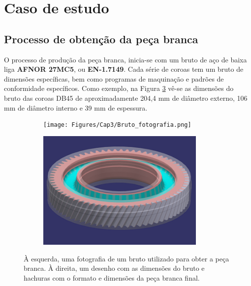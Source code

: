 \section{Caso de estudo} \label{sec:materiais_CS}
\subsection{Processo de obtenção da peça branca} \label{ssec:materiais_CS_peca_branca}

O processo de produção da peça branca, inicia-se com um bruto de aço de baixa liga \textbf{AFNOR 27MC5}, ou \textbf{EN-1.7149}. Cada série de coroas tem um bruto de dimensões específicas, bem como programas de maquinação e padrões de conformidade específicos. Como exemplo, na Figura \ref{fig:Bruto_desenho} vê-se as dimensões do bruto das coroas DB45 de aproximadamente 204,4 mm de diâmetro externo, 106 mm de diâmetro interno e 39 mm de espessura.

\begin{figure}[htb]
    \centering
    \begin{subfigure}{.5\textwidth}
        \centering
        \texttt{[image: Figures/Cap3/Bruto\_fotografia.png]}
        \caption{}
        \label{fig:Bruto_fotografia}
    \end{subfigure}%
    \begin{subfigure}{.5\textwidth}
        \centering
        \includegraphics[width = 0.9\textwidth]{Figures/Cap3/Bruto_CAD.png}
        \caption{}
        \label{fig:Bruto_desenho}
    \end{subfigure}
    \caption[Imagens do bruto para fabricação da peça branca]%
    {À esquerda, uma fotografia de um bruto utilizado para obter a peça branca. À direita, um desenho com as dimensões do bruto e hachuras com o formato e dimensões da peça branca final.}
\end{figure}

